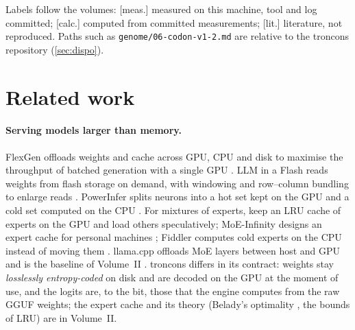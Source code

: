 \documentclass[11pt, a4paper]{article}
\theoremstyle{remark}
\newcommand{\etiq}[1]{\textsf{\scriptsize[#1]}}
\newcommand{\mes}{\etiq{meas.}}
\newcommand{\calc}{\etiq{calc.}}
\newcommand{\litt}{\etiq{lit.}}
\newcommand{\fichier}[1]{\textsf{\footnotesize\nolinkurl{#1}}}
\begin{document}
Labels follow the volumes: \mes{} measured on this machine, tool and log committed; \calc{} computed from committed measurements; \litt{} literature, not reproduced. Paths such as \fichier{genome/06-codon-v1-2.md} are relative to the troncons repository (\cref{sec:dispo}).

\section{Related work}\label{sec:travaux}

\paragraph{Serving models larger than memory.} FlexGen offloads weights and cache across GPU, CPU and disk to maximise the throughput of batched generation with a single GPU \citep{flexgen2023}. LLM in a Flash reads weights from flash storage on demand, with windowing and row--column bundling to enlarge reads \citep{llminflash2024}. PowerInfer splits neurons into a hot set kept on the GPU and a cold set computed on the CPU \citep{powerinfer2024}. For mixtures of experts, \citet{mixtraloffload2023} keep an LRU cache of experts on the GPU and load others speculatively; MoE-Infinity designs an expert cache for personal machines \citep{moeinfinity2024}; Fiddler computes cold experts on the CPU instead of moving them \citep{fiddler2025}. llama.cpp offloads MoE layers between host and GPU and is the baseline of Volume~II \citep{llamacpp2026b11515}. troncons differs in its contract: weights stay \emph{losslessly entropy-coded} on disk and are decoded on the GPU at the moment of use, and the logits are, to the bit, those that the engine computes from the raw GGUF weights; the expert cache and its theory (Belady's optimality \citep{belady1966}, the bounds of LRU) are in Volume~II.
\end{document}

